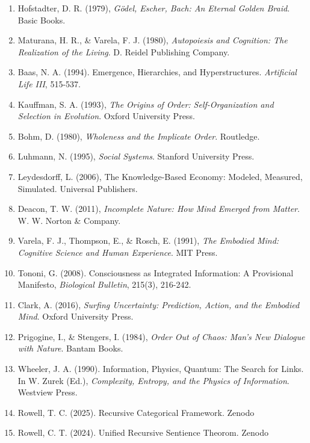 \documentclass[12pt]{article}
\providecommand{\tightlist}{%
  \setlength{\itemsep}{0pt}\setlength{\parskip}{0pt}}
\begin{document}
\begin{enumerate}
\def\labelenumi{\arabic{enumi}.}
\tightlist
\item
  Hofstadter, D. R. (1979), \emph{Gödel, Escher, Bach: An Eternal Golden
  Braid}. Basic Books.
\item
  Maturana, H. R., \& Varela, F. J. (1980), \emph{Autopoiesis and
  Cognition: The Realization of the Living}. D. Reidel Publishing
  Company.
\item
  Baas, N. A. (1994). Emergence, Hierarchies, and Hyperstructures.
  \emph{Artificial Life III}, 515-537.
\item
  Kauffman, S. A. (1993), \emph{The Origins of Order: Self-Organization
  and Selection in Evolution}. Oxford University Press.
\item
  Bohm, D. (1980), \emph{Wholeness and the Implicate Order}. Routledge.
\item
  Luhmann, N. (1995), \emph{Social Systems}. Stanford University Press.
\item
  Leydesdorff, L. (2006), The Knowledge-Based Economy: Modeled,
  Measured, Simulated. Universal Publishers.
\item
  Deacon, T. W. (2011), \emph{Incomplete Nature: How Mind Emerged from
  Matter}. W. W. Norton \& Company.
\item
  Varela, F. J., Thompson, E., \& Rosch, E. (1991), \emph{The Embodied
  Mind: Cognitive Science and Human Experience}. MIT Press.
\item
  Tononi, G. (2008). Consciousness as Integrated Information: A
  Provisional Manifesto, \emph{Biological Bulletin}, 215(3), 216-242.
\item
  Clark, A. (2016), \emph{Surfing Uncertainty: Prediction, Action, and
  the Embodied Mind}. Oxford University Press.
\item
  Prigogine, I., \& Stengers, I. (1984), \emph{Order Out of Chaos: Man's
  New Dialogue with Nature}. Bantam Books.
\item
  Wheeler, J. A. (1990). Information, Physics, Quantum: The Search for
  Links. In W. Zurek (Ed.), \emph{Complexity, Entropy, and the Physics
  of Information}. Westview Press.

\item
  Rowell, T. C. (2025). Recursive Categorical Framework. Zenodo

\item
  Rowell, C. T. (2024). Unified Recursive Sentience Theorom. Zenodo
\end{enumerate}
\end{document}
